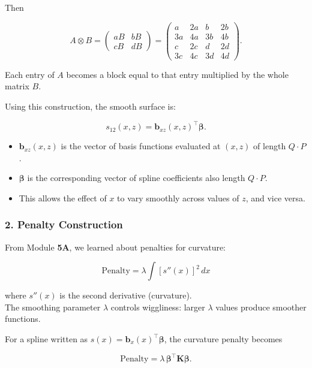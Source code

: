 \documentclass[
  letterpaper,
  DIV=11,
  numbers=noendperiod]{scrreprt}
\providecommand{\tightlist}{%
  \setlength{\itemsep}{0pt}\setlength{\parskip}{0pt}}\usepackage{longtable,booktabs,array}
\begin{document}
\begin{tcolorbox}[enhanced jigsaw, rightrule=.15mm, breakable, left=2mm, colframe=quarto-callout-tip-color-frame, opacityback=0, leftrule=.75mm, toprule=.15mm, colback=white, arc=.35mm, bottomrule=.15mm]
Then

\[
A \otimes B
=
\begin{pmatrix}
aB & bB \\
cB & dB
\end{pmatrix}
=
\begin{pmatrix}
a & 2a & b & 2b \\
3a & 4a & 3b & 4b \\
c & 2c & d & 2d \\
3c & 4c & 3d & 4d
\end{pmatrix}.
\]

Each entry of \(A\) becomes a block equal to that entry multiplied by
the whole matrix \(B\).

\end{tcolorbox}

Using this construction, the smooth surface is:

\[
s_{12}(x,z) = \mathbf{b}_{xz}(x,z)^\top \boldsymbol{\beta}.
\]

\begin{itemize}
\tightlist
\item
  \(\mathbf{b}_{xz}(x,z)\) is the vector of basis functions evaluated at
  \((x,z)\) of length \(Q\cdot P\).
\item
  \(\mathbf{\beta}\) is the corresponding vector of spline coefficients
  also length \(Q\cdot P\).
\item
  This allows the effect of \(x\) to vary smoothly across values of
  \(z\), and vice versa.
\end{itemize}

\hypertarget{penalty-construction}{%
\subsubsection*{2. Penalty Construction}\label{penalty-construction}}

From Module \textbf{5A}, we learned about penalties for curvature:

\[
\text{Penalty} = \lambda \int [s''(x)]^2 \, dx
\]

where \(s''(x)\) is the second derivative (curvature).\\
The smoothing parameter \(\lambda\) controls wiggliness: larger
\(\lambda\) values produce smoother functions.

For a spline written as
\(s(x) = \mathbf{b}_x(x)^\top \boldsymbol{\beta}\), the curvature
penalty becomes

\[
\text{Penalty} = \lambda\, \boldsymbol{\beta}^\top \mathbf{K} \boldsymbol{\beta}.
\]
\end{document}
